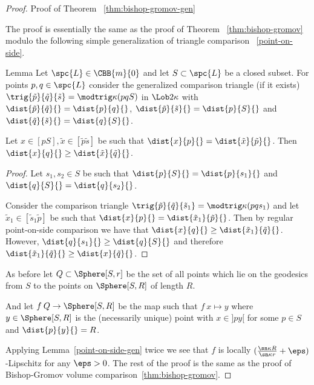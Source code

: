 \begin{proof}{Proof of Theorem ~\ref{thm:bishop-gromov-gen}}

The proof is essentially the same as the proof of Theorem ~\ref{thm:bishop-gromov} modulo the following simple generalization of triangle comparison ~\ref{point-on-side}.

\begin{thm}{Lemma}\label{point-on-side-gen}
Let $\spc{L}\in\CBB{m}{0}$ and let $S\subset \spc{L}$ be a closed subset. For points $p,q\in \spc{L}$  consider the generalized comparison triangle (if it exists)  $\trig{\tilde p}{\tilde q}{\tilde s}=\modtrig\kappa(p q S)$ in $\Lob2\kappa$
with $\dist{\tilde p}{\tilde q}{}=\dist{p}{q}{}$, $\dist{\tilde p}{\tilde s}{}=\dist{p}{S}{}$ and  $\dist{\tilde q}{\tilde s}{}=\dist{q}{S}{}$.

Let $x\in[pS], \tilde x\in [\tilde p\tilde s]$ be such that $\dist{x}{p}{}=\dist{\tilde x}{\tilde p}{}$. Then $\dist{x}{q}{}\ge\dist{\tilde x}{\tilde q}{}$.
\end{thm}
\begin{proof}
Let $s_1,s_2\in S$ be such that $\dist{p}{S}{}=\dist{p}{s_1}{}$ and   $\dist{q}{S}{}=\dist{q}{s_2}{}$.  

Consider the comparison triangle  $\trig{\tilde p}{\tilde q}{\tilde s_1}=\modtrig\kappa(p q s_1)$ and let $\tilde x_1\in [\tilde s_1\tilde p]$ be such that  $\dist{x}{p}{}=\dist{\tilde x_1}{\tilde p}{}$. Then by regular point-on-side comparison we have that $\dist{x}{q}{}\ge \dist{\tilde x_1}{\tilde q}{}$. However, $\dist {q}{s_1}{}\ge\dist{q}{S}{}$ and therefore $\dist{\tilde x_1}{\tilde q}{}\ge \dist{x}{\tilde q}{} $.

\end{proof}

As before let  $Q\subset \Sphere[S,r]$ be the set of all points 
which lie on the geodesics from $S$ to the points on $\Sphere[S,R]$ of length $R$.

And let $f\:Q\to \Sphere[S,R]$ be the map such that $f\:x\mapsto y$ where $y\in \Sphere[S,R]$ is the (necessarily unique) point with $x\in ]py[$ for some $p\in S$  and $\dist{p}{y}{}=R$.

Applying Lemma~\ref{point-on-side-gen} twice we see that $f$ is locally  $(\tfrac{\sn\kappa R}{\sn\kappa r}+\eps)$-Lipschitz for any $\eps>0$. The rest of the proof is the same as the proof of  Bishop-Gromov volume comparison~\ref {thm:bishop-gromov}.


\begin{comment}
The main step is to prove the following generalization of Proposition~\ref{prop:monotonic-spheres}:


\end{comment}
\end{proof}
